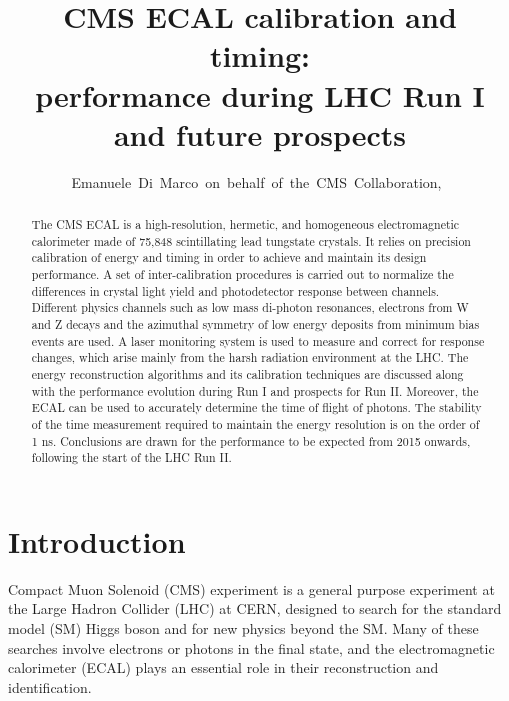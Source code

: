 \documentclass[journal]{IEEEtran}
\begin{document}
\title{CMS ECAL calibration and timing: \\ performance during LHC Run I and future prospects}

\author{Emanuele~Di~Marco~on~behalf~of~the~CMS~Collaboration,~}

\maketitle


\begin{abstract}
The CMS ECAL is a high-resolution, hermetic, and homogeneous electromagnetic calorimeter made of 75,848 scintillating lead tungstate crystals. It relies on precision calibration of energy and timing in order to achieve and maintain its design performance. A set of inter-calibration procedures is carried out to normalize the differences in crystal light yield and photodetector response between channels. Different physics channels such as low mass di-photon resonances, electrons from W and Z decays and the azimuthal symmetry of low energy deposits from minimum bias events are used. A laser monitoring system is used to measure and correct for response changes, which arise mainly from the harsh radiation environment at the LHC. The energy reconstruction algorithms and its calibration techniques are discussed along with the performance evolution during Run I and prospects for Run II. Moreover, the ECAL can be used to accurately determine the time of flight of photons. The stability of the time measurement required to maintain the energy resolution is on the order of 1 ns. Conclusions are drawn for the performance to be expected from 2015 onwards, following the start of the LHC Run II.
\end{abstract}

\begin{IEEEkeywords}
\end{IEEEkeywords}

\IEEEpeerreviewmaketitle



\section{Introduction}
\label{sec:introduction}
 Compact Muon Solenoid (CMS) experiment \cite{Chatrchyan:2008aa} is a general purpose experiment at the Large Hadron Collider (LHC) at CERN, designed to search for the standard model (SM) Higgs boson and for new physics beyond the SM. Many of these searches involve electrons or photons in the final state, and the electromagnetic calorimeter (ECAL) plays an essential role in their reconstruction and identification.
\end{document}
